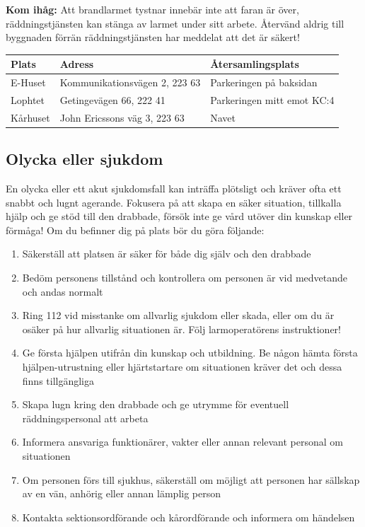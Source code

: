 \documentclass[pdfbookmarks,a4paper,11pt]{article}
\begin{document}
\textbf{Kom ihåg:} Att brandlarmet tystnar innebär inte att faran är över, räddningstjänsten kan stänga av larmet under sitt arbete. Återvänd aldrig till byggnaden förrän räddningstjänsten har meddelat att det är säkert!

\begin{table}[h]
\centering
\renewcommand{\arraystretch}{1.3} %

\begin{tabularx}{\textwidth}{l X X}
\toprule
\textbf{Plats} & \textbf{Adress} & \textbf{Återsamlingsplats} \\
\midrule
E-Huset & Kommunikationsvägen 2, 223 63 & Parkeringen på baksidan \\
Lophtet & Getingevägen 66, 222 41 & Parkeringen mitt emot KC:4 \\
Kårhuset & John Ericssons väg 3, 223 63 & Navet \\
\bottomrule
\end{tabularx}
\end{table}

\subsection{Olycka eller sjukdom}

En olycka eller ett akut sjukdomsfall kan inträffa plötsligt och kräver ofta ett snabbt och lugnt agerande. Fokusera på att skapa en säker situation, tillkalla hjälp och ge stöd till den drabbade, försök inte ge vård utöver din kunskap eller förmåga! Om du befinner dig på plats bör du göra följande:

\begin{enumerate}
    \item Säkerställ att platsen är säker för både dig själv och den drabbade
    \item Bedöm personens tillstånd och kontrollera om personen är vid medvetande och andas normalt
    \item Ring 112 vid misstanke om allvarlig sjukdom eller skada, eller om du är osäker på hur allvarlig situationen är. Följ larmoperatörens instruktioner!
    \item Ge första hjälpen utifrån din kunskap och utbildning. Be någon hämta första hjälpen-utrustning eller hjärtstartare om situationen kräver det och dessa finns tillgängliga
    \item Skapa lugn kring den drabbade och ge utrymme för eventuell räddningspersonal att arbeta
    \item Informera ansvariga funktionärer, vakter eller annan relevant personal om situationen
    \item Om personen förs till sjukhus, säkerställ om möjligt att personen har sällskap av en vän, anhörig eller annan lämplig person
    \item Kontakta sektionsordförande och kårordförande och informera om händelsen
\end{enumerate}
\end{document}
